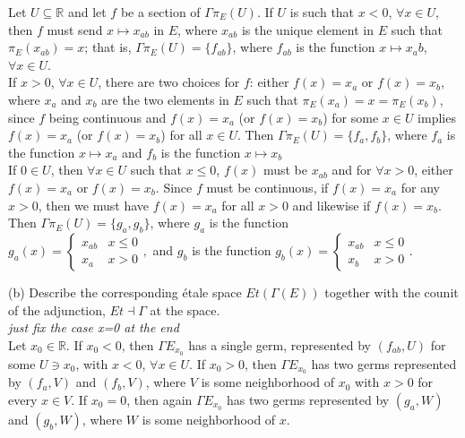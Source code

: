 Let $U \subseteq \mathbb{R}$ and let $f$ be a section of $\Gamma \pi_E(U)$. If $U$ is such that $x < 0$, $\forall x \in U$, then $f$ must send $x \mapsto x_{ab}$ in $E$, where $x_{ab}$ is the unique element in $E$ such that $\pi_E(x_{ab})=x$; that is, $\Gamma\pi_E(U) = \{f_{ab}\}$, where $f_{ab}$ is the function $x \mapsto x_ab$, $\forall x \in U$.\\

If $x >0$, $\forall x \in U$, there are two choices for $f$: either $f(x) = x_a$ or $f(x)=x_b$, where $x_a$ and $x_b$ are the two elements in $E$ such that $\pi_E(x_a)=x=\pi_E(x_b)$, since $f$ being continuous and $f(x)=x_a$ (or $f(x)=x_b$) for some $x \in U$ implies $f(x)=x_a$ (or $f(x)=x_b$) for all $x \in U$. Then  $\Gamma\pi_E(U) = \{f_a,f_b\}$, where $f_a$ is the function $x \mapsto x_a$ and $f_b$ is the function $x \mapsto x_b$ \\

If $0 \in U$, then $\forall x \in U$ such that $x \leq 0$, $f(x)$ must be $x_{ab}$ and for $\forall x>0$, either $f(x)=x_a$ or $f(x)=x_b$. Since $f$ must be continuous, if $f(x)=x_a$ for any $x>0$, then we must have $f(x)=x_a$ for all $x >0$ and likewise if $f(x)=x_b$. Then $\Gamma\pi_E(U)=\{g_a,g_b\}$, where $g_a$ is the function \\
$g_a(x) = \begin{cases}
x_{ab} & x \leq 0\\
x_a &  x >0
\end{cases},
$ and $g_b$ is the function
$g_b(x) = \begin{cases}
x_{ab} & x \leq 0\\
x_b &  x >0
\end{cases}.
$

(b) Describe the corresponding \'etale space $Et(\Gamma (E))$ together with the counit of the adjunction, $Et \dashv \Gamma $ at the space.\\

\textit{just fix the case x=0 at the end}\\

Let $x_0 \in \mathbb{R}$. If $x_0 <0$, then $\Gamma E_{x_0}$ has a single germ, represented by $(f_{ab}, U)$ for some $U \ni x_0$, with $x < 0$, $\forall x \in U$. If $x_0 >0$, then $\Gamma E_{x_0}$ has two germs represented by $(f_a,V)$ and $(f_b,V)$, where $V$ is some neighborhood of $x_0$ with $x>0$ for every $x \in V$. If $x_0=0$, then again $\Gamma E_{x_0}$ has two germs represented by $(g_a, W)$ and $(g_b,W)$, where $W$ is some neighborhood of $x$.\\

